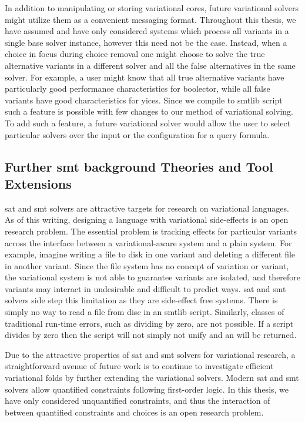 In addition to manipulating or storing variational cores, future variational
solvers might utilize them as a convenient messaging format. Throughout this
thesis, we have assumed and have only considered systems which process all
variants in a single base solver instance, however this need not be the case.
Instead, when a choice in focus during choice removal one might choose to solve
the true alternative variants in a different solver and all the false
alternatives in the same solver. For example, a user might know that all true
alternative variants have particularly good performance characteristics for
boolector, while all false variants have good characteristics for yices. Since
we compile to \acl{smtlib} script such a feature is possible with few changes to
our method of variational solving. To add such a feature, a future variational
solver would allow the user to select particular solvers over the input \vc{} or
the configuration for a query formula.

\subsection{Further \ac{smt} background Theories and Tool Extensions}
\ac{sat} and \ac{smt} solvers are attractive targets for research on variational
languages. As of this writing, designing a language with variational
side-effects is an open research problem. The essential problem is tracking
effects for particular variants across the interface between a variational-aware
system and a plain system. For example, imagine writing a file to disk in one
variant and deleting a different file in another variant. Since the file system
has no concept of variation or variant, the variational system is not able to
guarantee variants are isolated, and therefore variants may interact in
undesirable and difficult to predict ways. \ac{sat} and \ac{smt} solvers side
step this limitation as they are side-effect free systems. There is simply no
way to read a file from disc in an \acl{smtlib} script. Similarly, classes of
traditional run-time errors, such as dividing by zero, are not possible. If a
script divides by zero then the script will not simply not unify and an
 will be returned.

Due to the attractive properties of \ac{sat} and \ac{smt} solvers for
variational research, a straightforward avenue of future work is to continue to
investigate efficient variational folds by further extending the variational
solvers. Modern \ac{sat} and \ac{smt} solvers allow quantified constraints
following first-order logic. In this thesis, we have only considered
unquantified constraints, and thus the interaction of between quantified
constraints and choices is an open research problem.

